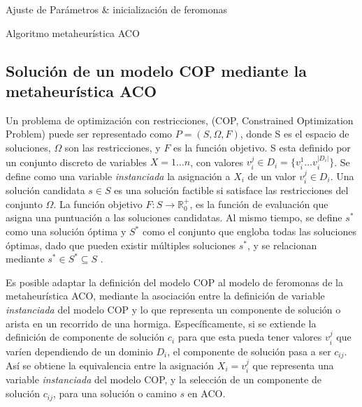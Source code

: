 \begin{algorithm}[H]
\SetAlgoLined
 Ajuste de Par\'ametros \& inicializaci\'on de feromonas\;
 \caption{Algoritmo metaheur\'istica ACO}\label{ACO-Algo}
\end{algorithm}



\subsection{Soluci\'on de un modelo COP mediante la metaheur\'istica ACO}

Un problema de optimización con restricciones, (COP, Constrained Optimization Problem) puede ser representado como $P = (S, \Omega, F)$, donde S es el espacio de soluciones, $\Omega$ son las restricciones, y $F$ es la funci\'on objetivo. S esta definido por un conjunto discreto de variables $X = 1 \dotsc n$, con valores $v_{i}^{j} \in D_{i} = \{v_{i}^{1} \dotsc  v_{i}^{|D_{i}|}\}$. Se define como una variable {\it instanciada} la asignaci\'on a $X_i$ de un valor $v_{i}^{j} \in D_i$. Una solución candidata $s \in S$ es una soluci\'on factible si satisface las restricciones del conjunto $\Omega$. La funci\'on objetivo $F: S\rightarrow \mathbb R_{0}^{+}$, es la funci\'on de evaluaci\'on que asigna una puntuaci\'on a las soluciones candidatas. Al mismo tiempo, se define $s^{*}$ como una soluci\'on \'optima y $S^{*}$ como el conjunto que engloba todas las soluciones \'optimas, dado que pueden existir m\'ultiples soluciones $s^{*}$, y se relacionan mediante $s^{*} \in S^{*} \subseteq S $ \cite{socha2008ant}.

Es posible adaptar la definici\'on del modelo COP al modelo de feromonas de la metaheur\'istica ACO, mediante la asociaci\'on entre la definici\'on de variable {\it instanciada} del modelo COP y lo que representa un componente de soluci\'on o arista en un recorrido de una hormiga. 
Espec\'ificamente, si se extiende la definici\'on de componente de soluci\'on $c_{i}$ para que esta pueda tener valores $v_{i}^{j}$ que var\'ien dependiendo de un dominio $D_i$, el componente de soluci\'on pasa a ser $c_{ij}$. As\'i se obtiene la equivalencia entre la asignaci\'on $X_i = v_{i}^{j}$ que representa una variable {\it instanciada} del modelo COP, y la selecci\'on de un componente de soluci\'on $c_{ij}$,  para una soluci\'on o camino $s$ en ACO\cite{socha2008ant}.


